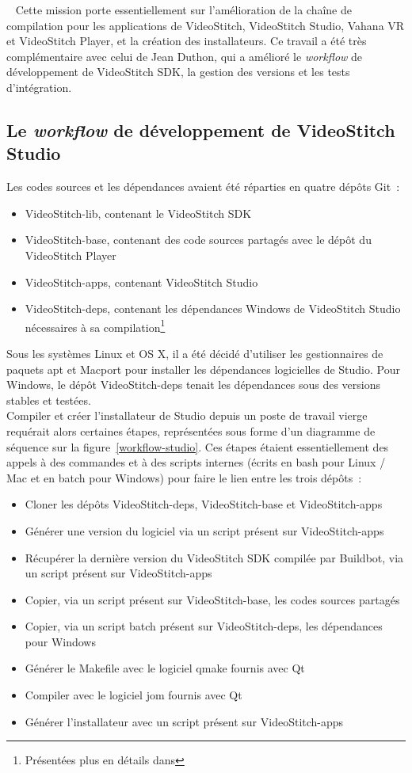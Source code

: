 \ \newline
Cette mission porte essentiellement sur l'amélioration de la chaîne de compilation
pour les applications de VideoStitch, VideoStitch Studio, Vahana VR et VideoStitch
Player, et la création des installateurs. Ce travail a été très complémentaire avec
celui de Jean Duthon, qui a amélioré le \textit{workflow} de développement de VideoStitch SDK,
la gestion des versions et les tests d'intégration.

\subsection{Le \textit{workflow} de développement de VideoStitch Studio} 
Les codes sources et les dépendances avaient été réparties en quatre dépôts Git~: 
\begin{itemize}
  \item VideoStitch-lib, contenant le VideoStitch SDK
  \item VideoStitch-base, contenant des code sources partagés avec le dépôt du VideoStitch Player
  \item VideoStitch-apps, contenant VideoStitch Studio
  \item VideoStitch-deps, contenant les dépendances Windows de VideoStitch Studio 
  nécessaires à sa compilation\footnote{Présentées plus en détails dans }
\end{itemize}
Sous les systèmes Linux et OS X, il a été décidé d'utiliser les gestionnaires
de paquets apt et Macport pour installer les dépendances logicielles de Studio. Pour
Windows, le dépôt VideoStitch-deps tenait les dépendances sous des versions stables et testées.\\
\newline
Compiler et créer l'installateur de Studio depuis un poste de travail vierge requérait alors
certaines étapes, représentées sous forme d'un diagramme de séquence sur la figure~\ref{workflow-studio}.
Ces étapes étaient essentiellement des appels à des commandes et à des scripts internes
(écrits en bash pour Linux / Mac et en batch pour Windows) pour faire le lien entre les trois dépôts~:
\begin{itemize}
  \item Cloner les dépôts VideoStitch-deps, VideoStitch-base et VideoStitch-apps
  \item Générer une version du logiciel via un script présent sur VideoStitch-apps
  \item Récupérer la dernière version du VideoStitch SDK compilée par Buildbot, 
  via un script présent sur VideoStitch-apps
  \item Copier, via un script présent sur VideoStitch-base, les codes sources partagés
  \item Copier, via un script batch présent sur VideoStitch-deps, les dépendances pour Windows
  \item Générer le Makefile avec le logiciel qmake fournis avec Qt
  \item Compiler avec le logiciel jom fournis avec Qt
  \item Générer l'installateur avec un script présent sur VideoStitch-apps
\end{itemize}
